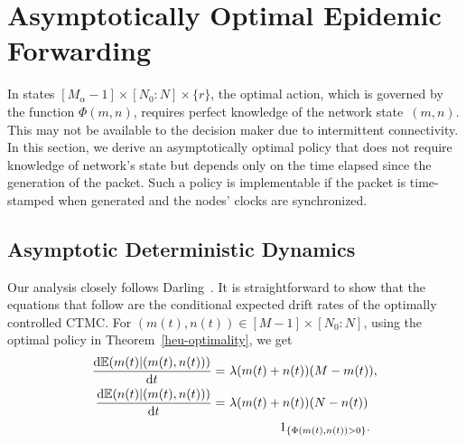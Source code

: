 \documentclass[10pt,journal,letterpaper]{IEEEtran}
\begin{document}
\section{Asymptotically Optimal Epidemic Forwarding}
\label{asym-opt-forward}

In states $[M_{\alpha}-1] \times [N_0:N] \times \{r\}$, the optimal
action, which is governed by the function $\Phi(m,n)$, requires
perfect knowledge of the network state~$(m,n)$.
This may not be available to the decision maker due to intermittent
connectivity.
In this section, we derive an asymptotically optimal policy that
does not require knowledge of network's state but depends only on
the time elapsed since the generation of the packet. Such a policy
is implementable if the packet is time-stamped when generated and
the nodes' clocks are synchronized.


\subsection{Asymptotic Deterministic Dynamics}
\label{asym-det-dynamics}
 Our analysis closely follows
Darling~\cite{stochproc.darling02fluid-limits}. It is
straightforward to show that the equations that follow are the conditional expected
drift rates of the optimally controlled CTMC. For $(m(t),n(t)) \in
[M-1] \times [N_0:N]$, using the optimal policy in Theorem~\ref{heu-optimality}, we get
\begin{subequations}
\begin{align}
\frac{{\rm d}\mathbb{E}(m(t)|(m(t),n(t)))}{{\rm d}t} = &~\lambda (m(t) + n(t))(M-m(t)), \label{eqn:drift-1}\\
\frac{{\rm d}\mathbb{E}(n(t)|(m(t),n(t)))}{{\rm d}t} = &~\lambda (m(t) + n(t))(N-n(t)) \nonumber\\
& \ \ \ \ \ \ \ \ \ \ \ \ \ 1_{\{\Phi(m(t),n(t)) > 0\}}. \label{eqn:drift-2}
\end{align}
\end{subequations}
\end{document}
